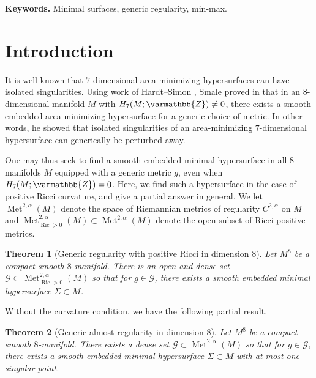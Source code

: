 \documentclass[12pt,twoside]{amsart}
\numberwithin{equation}{section}
\renewcommand{\mathbb}{\varmathbb}
\newtheorem{theorem}{Theorem}[section]
\newcommand{\cG}{\mathcal G}
\DeclareMathOperator{\Ric}{Ric}
\DeclareMathOperator{\Met}{Met}
\begin{document}
\noindent \textbf{Keywords.} Minimal surfaces, generic regularity, min-max. 
\vspace{0.5cm}






\section*{Introduction}


It is well known that $7$-dimensional area minimizing hypersurfaces can have isolated singularities. Using work of Hardt--Simon \cite{HS}, Smale proved in \cite{Smale} that in an $8$-dimensional manifold $M$ with $H_7(M; \mathbb{Z}) \neq 0$, there exists a smooth embedded area minimizing hypersurface for a generic choice of metric. In other words, he showed that isolated singularities of an area-minimizing $7$-dimensional hypersurface can generically be perturbed away. 

One may thus seek to find a smooth embedded minimal hypersurface in all $8$-manifolds $M$ equipped with a generic metric $g$, even when $H_7(M;\mathbb{Z})=0$. Here, we find such a hypersurface in the case of positive Ricci curvature, and give a partial answer in general. We let $\Met^{2,\alpha}(M)$ denote the space of Riemannian metrics of regularity $C^{2,\alpha}$ on $M$ and $\Met^{2,\alpha}_{\Ric>0}(M)\subset\Met^{2,\alpha}(M)$ denote the open subset of Ricci positive metrics. 

\begin{theorem}[Generic regularity with positive Ricci in dimension $8$]\label{thm:generic_bound_ricci}
Let $M^8$ be a compact smooth $8$-manifold. There is an open and dense set $\cG \subset \Met_{\Ric>0}^{2,\alpha}(M)$ so that for $g\in \cG$, there exists a smooth embedded minimal hypersurface $\Sigma \subset M$. 
\end{theorem}

Without the curvature condition, we have the following partial result. 

  \begin{theorem}[Generic almost regularity in dimension $8$]\label{thm:generic_bound}
  	Let $M^8$ be a compact smooth $8$-manifold. There exists a dense set $\cG \subset \Met^{2,\alpha}(M)$ so that for $g \in \cG$,  there exists a smooth embedded minimal hypersurface $\Sigma \subset M$ with at most one singular point. 
  \end{theorem}
 
\end{document}
